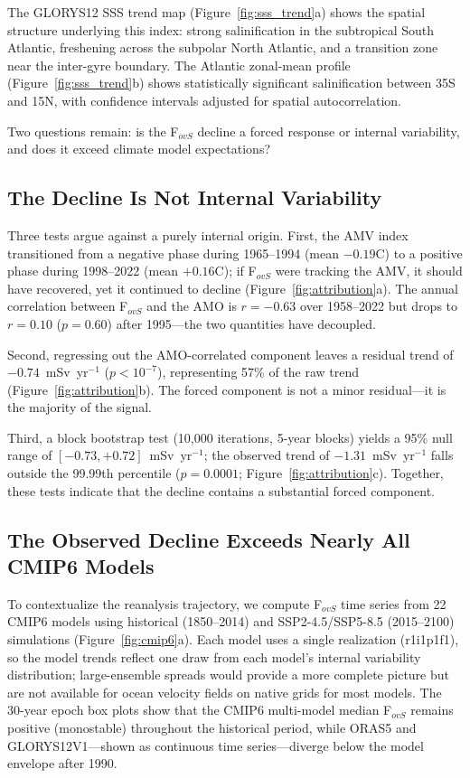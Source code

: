 \documentclass{agujournal2019}
\begin{document}
The GLORYS12 SSS trend map (Figure~\ref{fig:sss_trend}a) shows the spatial structure underlying this index: strong salinification in the subtropical South Atlantic, freshening across the subpolar North Atlantic, and a transition zone near the inter-gyre boundary. The Atlantic zonal-mean profile (Figure~\ref{fig:sss_trend}b) shows statistically significant salinification between 35\textdegree S and 15\textdegree N, with confidence intervals adjusted for spatial autocorrelation.

Two questions remain: is the F$_{ovS}$ decline a forced response or internal variability, and does it exceed climate model expectations?

\subsection{The Decline Is Not Internal Variability}

Three tests argue against a purely internal origin. First, the AMV index transitioned from a negative phase during 1965--1994 (mean $-0.19$\textdegree C) to a positive phase during 1998--2022 (mean $+0.16$\textdegree C); if F$_{ovS}$ were tracking the AMV, it should have recovered, yet it continued to decline (Figure~\ref{fig:attribution}a). The annual correlation between F$_{ovS}$ and the AMO is $r = -0.63$ over 1958--2022 but drops to $r = 0.10$ ($p = 0.60$) after 1995---the two quantities have decoupled.

Second, regressing out the AMO-correlated component leaves a residual trend of $-0.74$~mSv~yr$^{-1}$ ($p < 10^{-7}$), representing 57\% of the raw trend (Figure~\ref{fig:attribution}b). The forced component is not a minor residual---it is the majority of the signal.

Third, a block bootstrap test (10,000 iterations, 5-year blocks) yields a 95\% null range of $[-0.73, +0.72]$~mSv~yr$^{-1}$; the observed trend of $-1.31$~mSv~yr$^{-1}$ falls outside the 99.99th percentile ($p = 0.0001$; Figure~\ref{fig:attribution}c). Together, these tests indicate that the decline contains a substantial forced component.

\subsection{The Observed Decline Exceeds Nearly All CMIP6 Models}

To contextualize the reanalysis trajectory, we compute F$_{ovS}$ time series from 22 CMIP6 models using historical (1850--2014) and SSP2-4.5/SSP5-8.5 (2015--2100) simulations (Figure~\ref{fig:cmip6}a). Each model uses a single realization (r1i1p1f1), so the model trends reflect one draw from each model's internal variability distribution; large-ensemble spreads would provide a more complete picture but are not available for ocean velocity fields on native grids for most models. The 30-year epoch box plots show that the CMIP6 multi-model median F$_{ovS}$ remains positive (monostable) throughout the historical period, while ORAS5 and GLORYS12V1---shown as continuous time series---diverge below the model envelope after 1990.
\end{document}
